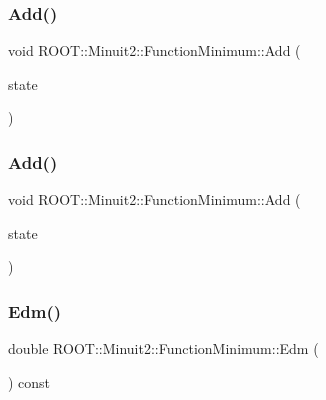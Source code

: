 \subsubsection{\texorpdfstring{Add()}{Add()}\hspace{0.1cm}{\footnotesize\ttfamily [2/3]}}
{\footnotesize\ttfamily void R\+O\+O\+T\+::\+Minuit2\+::\+Function\+Minimum\+::\+Add (\begin{DoxyParamCaption}\item[{const \mbox{\hyperlink{classROOT_1_1Minuit2_1_1MinimumState}{Minimum\+State}} \&}]{state }\end{DoxyParamCaption})\hspace{0.3cm}{\ttfamily [inline]}}

\mbox{\label{classROOT_1_1Minuit2_1_1FunctionMinimum_a13b69e2d431d568f4485eb8b79d6c781}} 
\subsubsection{\texorpdfstring{Add()}{Add()}\hspace{0.1cm}{\footnotesize\ttfamily [3/3]}}
{\footnotesize\ttfamily void R\+O\+O\+T\+::\+Minuit2\+::\+Function\+Minimum\+::\+Add (\begin{DoxyParamCaption}\item[{const \mbox{\hyperlink{classROOT_1_1Minuit2_1_1MinimumState}{Minimum\+State}} \&}]{state }\end{DoxyParamCaption})\hspace{0.3cm}{\ttfamily [inline]}}

\mbox{\label{classROOT_1_1Minuit2_1_1FunctionMinimum_aef90d7ca242a7ea211d56b188679f4b9}} 
\subsubsection{\texorpdfstring{Edm()}{Edm()}\hspace{0.1cm}{\footnotesize\ttfamily [1/3]}}
{\footnotesize\ttfamily double R\+O\+O\+T\+::\+Minuit2\+::\+Function\+Minimum\+::\+Edm (\begin{DoxyParamCaption}{ }\end{DoxyParamCaption}) const\hspace{0.3cm}{\ttfamily [inline]}}

